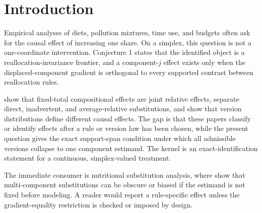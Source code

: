 \documentclass[11pt]{article}
\theoremstyle{definition}
\theoremstyle{plain}
\theoremstyle{remark}
\begin{document}
\section{Introduction}
Empirical analyses of diets, pollution mixtures, time use, and budgets often ask for the causal effect of increasing one share. On a simplex, this question is not a one-coordinate intervention. Conjecture 1 states that the identified object is a reallocation-invariance frontier, and a component-\(j\) effect exists only when the displaced-component gradient is orthogonal to every supported contrast between reallocation rules.

\citet[][pp. 1310--1312]{ArnoldBerrieTennantGilthorpe2020} show that fixed-total compositional effects are joint relative effects, \citet[][pp. 1380--1384]{TomovaGilthorpeTennant2022} separate direct, inadvertent, and average-relative substitutions, and \citet[][Sec. 4]{VanderWeeleHernan2013} show that version distributions define different causal effects. The gap is that these papers classify or identify effects after a rule or version law has been chosen, while the present question gives the exact support-span condition under which all admissible versions collapse to one component estimand. The kernel is an exact-identification statement for a continuous, simplex-valued treatment.

The immediate consumer is nutritional substitution analysis, where \citet{TomovaGilthorpeTennant2022} show that multi-component substitutions can be obscure or biased if the estimand is not fixed before modeling. A reader would report a rule-specific effect unless the gradient-equality restriction is checked or imposed by design.
\end{document}
